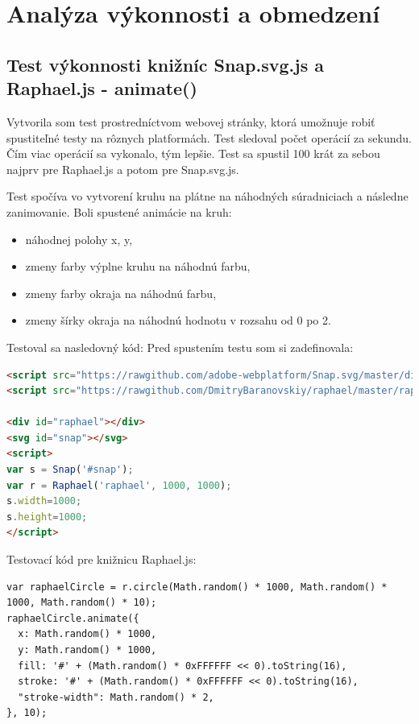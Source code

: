 \chapter{Analýza výkonnosti a obmedzení }


\section{Test výkonnosti knižníc Snap.svg.js a Raphael.js - animate()}

Vytvorila som test prostredníctvom webovej stránky, ktorá umožnuje robiť spustiteľné testy na rôznych platformách. Test sledoval počet operácií za sekundu. Čím viac operácií sa vykonalo, tým lepšie. Test sa spustil 100 krát za sebou najprv pre Raphael.js a potom pre Snap.svg.js. \cite{test}
 


Test spočíva vo vytvorení kruhu na plátne na náhodných súradniciach a následne zanimovanie. Boli spustené animácie na kruh: 
\begin{itemize} \item náhodnej polohy x, y, 
\item zmeny farby výplne kruhu na náhodnú farbu, 
\item zmeny farby okraja na náhodnú farbu, 
\item zmeny šírky okraja na náhodnú hodnotu v rozsahu od 0 po 2. 
\end{itemize}
Testoval sa nasledovný kód: 
Pred spustením testu som si zadefinovala: 
\begin{lstlisting}[language = html]
<script src="https://rawgithub.com/adobe-webplatform/Snap.svg/master/dist/snap.svg.js"></script>
<script src="https://rawgithub.com/DmitryBaranovskiy/raphael/master/raphael.js"></script>

<div id="raphael"></div>
<svg id="snap"></svg>
<script>
var s = Snap('#snap');
var r = Raphael('raphael', 1000, 1000);
s.width=1000;
s.height=1000;
</script>
\end{lstlisting}

Testovací kód pre knižnicu Raphael.js:
\begin{lstlisting}
var raphaelCircle = r.circle(Math.random() * 1000, Math.random() * 1000, Math.random() * 10);
raphaelCircle.animate({
  x: Math.random() * 1000,
  y: Math.random() * 1000,
  fill: '#' + (Math.random() * 0xFFFFFF << 0).toString(16),
  stroke: '#' + (Math.random() * 0xFFFFFF << 0).toString(16),
  "stroke-width": Math.random() * 2,
}, 10);
\end{lstlisting}

